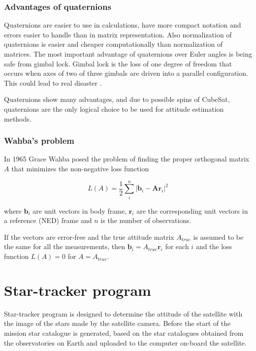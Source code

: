 \documentclass[12pt,a4paper,oneside]{article}
\begin{document}
\subsubsection{Advantages of quaternions}

Quaternions are easier to use in calculations, have more compact notation and errors easier to handle than in matrix representation. Also normalization of quaternions is easier and cheaper computationally than normalization of matrices.
The most important advantage of quaternions over Euler angles is being safe from gimbal lock. Gimbal lock is the loss of one degree of freedom that occurs when axes of two of three gimbals are driven into a parallel configuration. This could lead to real disaster \citet{shoemake1985animating}.

Quaternions show many advantages, and due to possible spins of CubeSat, quaternions are the only logical choice to be used for attitude estimation methods.

\subsubsection{Wahba's problem}


In 1965 Grace Wahba posed the problem of finding the proper orthogonal matrix $A$ that minimizes the non-negative loss function\cite{wahba1965least}

\begin{equation}
L(A) = \frac{1}{2} \sum_i^n|\bm{b}_i - \bm{Ar}_i|^2
\end{equation}

where $\bm{b}_i$ are unit vectors in body frame, $\bm{r}_i$ are the corresponding unit vectors in a reference (NED) frame and $n$ is the number of observations.

If the vectors are error-free and the true attitude matrix $A_{true}$ is assumed to be the same for all the measurements, then $\bm{b}_i = A_{true}\bm{r}_i$ for each $i$ and the loss function $L(A) = 0$ for $A = A_{true}$.


\newpage
\section{Star-tracker program}

Star-tracker program is designed to determine the attitude of the satellite with the image of the stars made by the satellite camera. Before the start of the mission star catalogue is generated, based on the star catalogues obtained from the observatories on Earth and uploaded to the computer on-board the satellite. 
\end{document}
